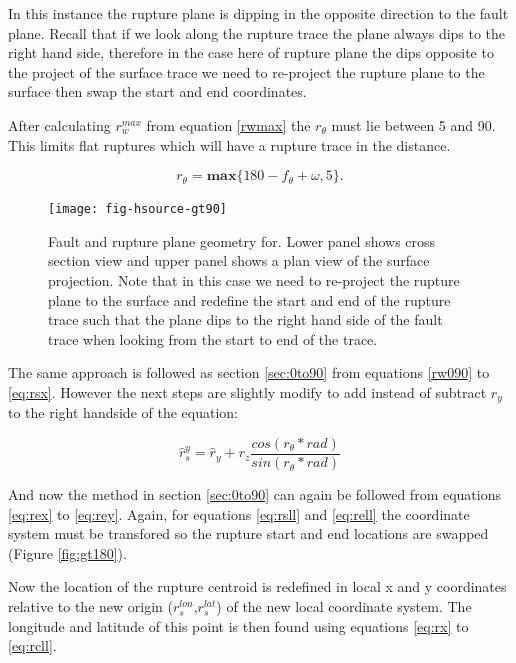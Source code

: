 In this instance the rupture plane is dipping in the opposite direction to the fault plane. Recall that if we look along 
the rupture trace the plane always dips to the right hand side, therefore in the case here of rupture plane the dips 
opposite to the project of the surface trace we need to re-project the rupture plane to the surface then swap the 
start and end coordinates. 



After calculating $r_w^{max}$ from equation \ref{rwmax} the $r_\theta$ must lie between 5 and 90. This limits flat ruptures which will have a rupture trace in the distance. 

\begin{equation}
r_\theta = \mathbf{max} \{ 180 - f_\theta + \omega, 5 \} .
\end{equation}



\begin{figure}[htp]
\centerline{\texttt{[image: fig-hsource-gt90]}}
\caption{Fault and rupture plane geometry for. Lower panel shows cross section view and upper panel shows a plan view of the surface 
projection. Note that in this case we need to re-project the rupture plane to the surface and redefine the start and end of the 
rupture trace such that the plane dips to the right hand side of the fault trace when looking from the start to end of the trace.}
\label{fig:gt90}
\end{figure}


The same approach is followed as section \ref{sec:0to90} from equations \ref{rw090} to \ref{eq:rsx}. However the next steps are slightly 
modify to add instead of subtract $r_y$ to the right handside of the equation: 

\begin{equation}
\hat{r}_s^{y} = \hat{r}_y + r_z  \frac{cos(r_\theta * rad)}{sin(r_\theta * rad)}
\end{equation}

And now the method in section \ref{sec:0to90} can again be followed from equations \ref{eq:rex} to \ref{eq:rey}. 
Again, for equations \ref{eq:rsll} and \ref{eq:rell} the coordinate system must be transfored so the rupture start and end locations are swapped (Figure \ref{fig:gt180}).

Now the location of the rupture centroid is redefined in local x and y coordinates relative to the new 
origin ($r_s^{lon}$,$ r_s^{lat}$) of the new local coordinate system. The longitude and 
latitude of this point is then found using equations \ref{eq:rx} to \ref{eq:rcll}.

